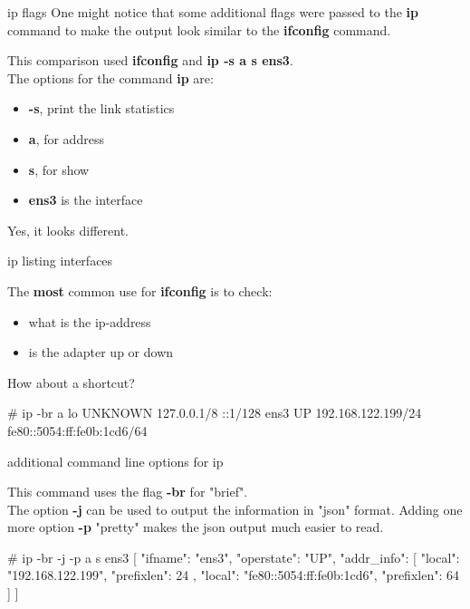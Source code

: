 \cprotect\note{ 

}

\begin{frame}
	{ip flags} 
	One might notice that some additional flags were passed to the \textbf{ip}
	command to make the output look similar to the \textbf{ifconfig} command. 


	This comparison used \textbf{ifconfig} and \textbf{ip -s a s ens3}. \\
	The options for the command \textbf{ip} are: 
		\begin{itemize}
			\item \textbf{-s}, print the link statistics 
			\item \textbf{a}, for address
			\item \textbf{s}, for show 
			\item \textbf{ens3} is the interface
		\end{itemize} 
		Yes, it looks different. 
\end{frame}

\cprotect\note{

}


\begin{frame}
	{ip listing interfaces} 

	The \textbf{most} common use for \textbf{ifconfig} 
	is to check: 
	\begin{itemize}
		\item what is the ip-address 
		\item is the adapter up or down
	\end{itemize}
	How about a shortcut? \\
		\begin{raw}
[root@rt ~]# ip -br a
lo               UNKNOWN        127.0.0.1/8 ::1/128 
ens3             UP             192.168.122.199/24 fe80::5054:ff:fe0b:1cd6/64 
		\end{raw}
\end{frame}

\cprotect\note{

}

\begin{frame}
	{additional command line options for ip}

	This command uses the flag \textbf{-br} for "brief".\\
	The option 
	\textbf{-j} can be used to output the information in "json" format. 
	Adding one more option \textbf{-p} "pretty" makes the json
	output much easier to read. 

	\begin{raw}
[root@rt ~]# ip -br -j -p a s ens3
[ {
        "ifname": "ens3",
        "operstate": "UP",
        "addr_info": [ {
                "local": "192.168.122.199",
                "prefixlen": 24
            },{
                "local": "fe80::5054:ff:fe0b:1cd6",
                "prefixlen": 64
            } ]
    } ]

   	\end{raw}
\end{frame}

